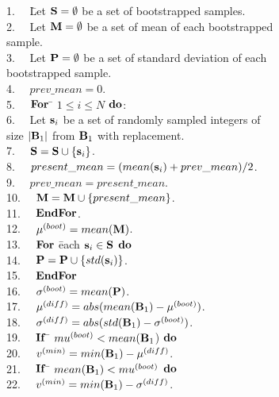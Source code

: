 \documentclass[lettersize,journal]{IEEEtran}
\begin{document}
\begin{tabbing}
1.~~ \= Let ${\bf S} = \emptyset$ be a set of bootstrapped samples. \\
2.~~ \> Let ${\bf M} = \emptyset$ be a set of mean of each bootstrapped \\
     \> sample. \\
3.~~ \> Let ${\bf P} = \emptyset$ be a set of standard deviation of each \\
     \> bootstrapped sample. \\
4.~~ \> $prev\_mean = 0$. \\
5.~~ \> ${\bf For}$ \= $1 \leq i \leq N$ ${\bf do}$: \\
6.~~ \>             \> Let ${\bf s}_{i}$ be a set of randomly sampled integers of \\
     \>             \> size $|{\bf B}_{1}|$ from ${\bf B}_{1}$ with replacement. \\
7.~~ \>             \> ${\bf S} = {\bf S} \cup \{{\bf s}_{i}\}$. \\
8.~~ \>             \> $present\_mean = (mean({\bf s}_{i}) + prev\_mean)/2$. \\
9.~~ \>             \> $prev\_mean = present\_mean$. \\
10.~~\>             \> ${\bf M} = {\bf M} \cup \{present\_mean\}$. \\
11.~~\> ${\bf EndFor}$. \\
12.~~\> $\mu^{(boot)} = mean({\bf M})$. \\
13.~~\> ${\bf For}$ \= each ${\bf s}_{i} \in {\bf S}$ ${\bf do}$ \\
14.~~\>             \> ${\bf P} = {\bf P} \cup \{std({\bf s}_{i})\}$. \\
15.~~\> ${\bf EndFor}$ \\
16.~~\> $\sigma^{(boot)} = mean({\bf P})$. \\
17.~~\> $\mu^{(diff)} = abs(mean({\bf B}_{1}) - \mu^{(boot)})$. \\
18.~~\> $\sigma^{(diff)} = abs(std({\bf B}_{1}) - \sigma^{(boot)})$. \\
19.~~\> ${\bf If}$ \= $mu^{(boot)} < mean({\bf B}_{1}$) ${\bf do}$ \\
20.~~\>            \> $v^{(min)} = min({\bf B}_{1}) - \mu^{(diff)}$. \\ 
21.~~\> ${\bf If}$ \= $mean({\bf B}_{1}) < mu^{(boot)}$ ${\bf do}$ \\
22.~~\>            \> $v^{(min)} = min({\bf B}_{1}) - \sigma^{(diff)}$. \\ 
\end{tabbing}
\end{document}
